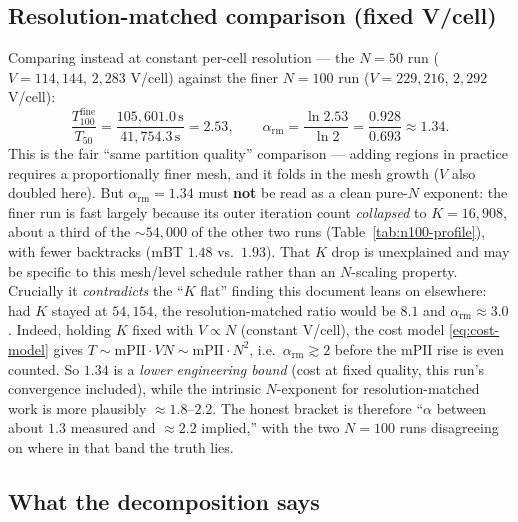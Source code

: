 \documentclass[11pt,a4paper]{article}
\begin{document}
\subsection{Resolution-matched comparison (fixed V/cell)}

Comparing instead at constant per-cell resolution --- the $N=50$ run
($V=114{,}144$, $2{,}283$ V/cell) against the finer $N=100$ run
($V=229{,}216$, $2{,}292$ V/cell):
\begin{equation}
  \frac{T_{100}^{\text{fine}}}{T_{50}}
  = \frac{105{,}601.0\,\text{s}}{41{,}754.3\,\text{s}}
  = 2.53,
  \qquad
  \alpha_{\text{rm}}
  = \frac{\ln 2.53}{\ln 2}
  = \frac{0.928}{0.693}
  \approx \mathbf{1.34}.
  \label{eq:alpha-rm}
\end{equation}
This is the fair ``same partition quality'' comparison --- adding regions in
practice requires a proportionally finer mesh, and it folds in the mesh growth
($V$ also doubled here).  But $\alpha_{\text{rm}}=1.34$ must \textbf{not} be read
as a clean pure-$N$ exponent: the finer run is fast largely because its outer
iteration count \emph{collapsed} to $K=16{,}908$, about a third of the
$\sim\!54{,}000$ of the other two runs (Table~\ref{tab:n100-profile}), with
fewer backtracks ($\mathrm{mBT}$ $1.48$ vs.\ $1.93$).  That $K$ drop is
unexplained and may be specific to this mesh/level schedule rather than an
$N$-scaling property.  Crucially it \emph{contradicts} the ``$K$ flat''
finding this document leans on elsewhere: had $K$ stayed at $54{,}154$, the
resolution-matched ratio would be $8.1$ and $\alpha_{\text{rm}}\approx3.0$.
Indeed, holding $K$ fixed with $V\propto N$ (constant V/cell), the cost model
\eqref{eq:cost-model} gives $T\sim\mathrm{mPII}\cdot V N\sim\mathrm{mPII}\cdot
N^2$, i.e.\ $\alpha_{\text{rm}}\gtrsim2$ before the $\mathrm{mPII}$ rise is even
counted.  So $1.34$ is a \emph{lower engineering bound} (cost at fixed quality,
this run's convergence included), while the intrinsic $N$-exponent for
resolution-matched work is more plausibly $\approx1.8$--$2.2$.  The honest
bracket is therefore ``$\alpha$ between about $1.3$ measured and $\approx2.2$
implied,'' with the two $N=100$ runs disagreeing on where in that band the truth
lies.

\subsection{What the decomposition says}
\end{document}
